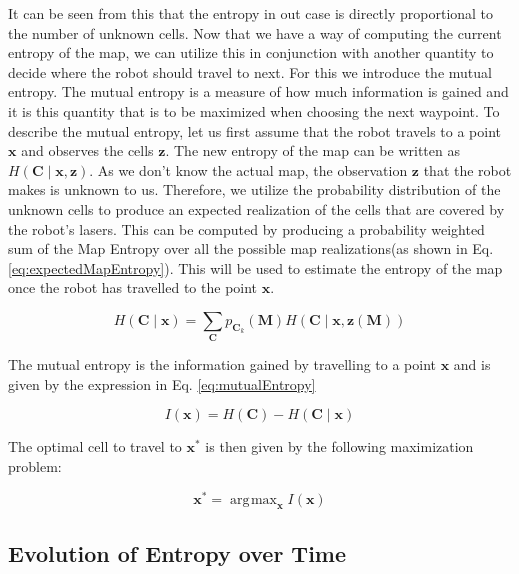 \documentclass[a4paper,12pt]{article}
\DeclareMathOperator*{\argmax}{\arg\!\max}
\begin{document}
			It can be seen from this that the entropy in out case is directly proportional to the number of unknown cells. Now that we have a way of computing the current entropy of the map, we can utilize this in conjunction with another quantity to decide where the robot should travel to next. For this we introduce the mutual entropy. The mutual entropy is a measure of how much information is gained and it is this quantity that is to be maximized when choosing the next waypoint. To describe the mutual entropy, let us first assume that the robot travels to a point $\textbf{x}$ and observes the cells $\textbf{z}$. The new entropy of the map can be written as $H\left(\textbf{C}\mid\textbf{x},\textbf{z}\right)$. As we don't know the actual map, the observation $\textbf{z}$ that the robot makes is unknown to us. Therefore, we utilize the probability distribution of the unknown cells to produce an expected realization of the cells that are covered by the robot's lasers. This can be computed by producing a probability weighted sum of the Map Entropy over all the possible map realizations(as shown in Eq. \ref{eq:expectedMapEntropy}). This will be used to estimate the entropy of the map once the robot has travelled to the point $\textbf{x}$. 

			\begin{equation}
				H(\textbf{C}\mid\textbf{x}) = \sum_{\textbf{C}} p_{\textbf{C}_k}(\textbf{M})H(\textbf{C}\mid\textbf{x},\textbf{z}(\textbf{M}))
				\label{eq:expectedMapEntropy}
			\end{equation}

			The mutual entropy is the information gained by travelling to a point $\textbf{x}$ and is given by the expression in Eq. \ref{eq:mutualEntropy}

			\begin{equation}
				I(\textbf{x}) = H \left(\textbf{C}\right) - H(\textbf{C}\mid\textbf{x})
				\label{eq:mutualEntropy}
			\end{equation}

			The optimal cell to travel to $\textbf{x}^{*}$ is then given by the following maximization problem:

			\begin{equation}
				\textbf{x}^{*} = \argmax_{\textbf{x}}I(\textbf{x})
				\label{eq:optimalCell}
			\end{equation}

		\subsection{Evolution of Entropy over Time}
\end{document}
